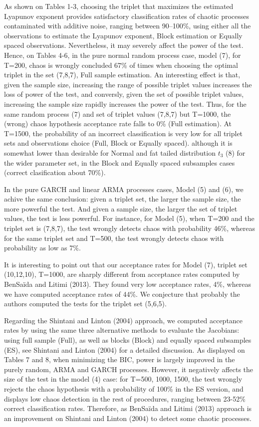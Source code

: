 \documentclass[12pt]{article}
\begin{document}
As shown on Tables 1-3, choosing the triplet that maximizes the estimated Lyapunov exponent provides satisfactory classification rates of chaotic processes contaminated with additive noise, ranging between 90--100\%, using either all the observations to estimate the Lyapunov exponent, Block estimation or Equally spaced observations. Nevertheless, it
may severely affect the power of the test. Hence, on Tables 4-6, in the pure normal random process case, model (7),
for T=200, chaos is wrongly concluded 67\% of times when choosing the 
optimal triplet in the set (7,8,7), Full sample estimation. An interesting effect is that, given the sample size, increasing the range
of possible triplet values increases the loss of power of the test, and conversly, given the set of 
possible triplet values, increasing the sample size rapidly increases the power of the test. Thus, for the same random process (7)
and set of triplet values (7,8,7) but T=1000, the (wrong) chaos hypothesis acceptance rate falls to 0\% (Full estimation). 
At T=1500, the probability of an incorrect classification is very low for all triplet sets and observations choice (Full, Block or Equally spaced). 
although it is somewhat lower than desirable for Normal and fat tailed distribution $t_3$ (8) for the wider parameter set, in the Block and Equally spaced subsamples cases (correct clasification about 70\%).

In the pure GARCH and linear ARMA processes cases, Model (5) and (6), we achive the same conclusion: given a
triplet set, the larger the sample size, the more powerful the test. And given a sample size, the larger the set of triplet values, the test is less powerful. For instance, for Model (5), when T=200 and the triplet set
is (7,8,7), the test wrongly detects chaos with probability 46\%, whereas
for the same triplet set and T=500, the test wrongly detects chaos with probability as low as 7\%.

It is interesting to point out that our acceptance rates for Model 
(7), triplet set (10,12,10), T=1000, are
sharply different from acceptance rates computed by BenSa\"{i}da and Litimi (2013). They found very low acceptance rates, 4\%, whereas we have computed acceptance rates of 44\%.
We conjecture that probably the authors computed the tests for the triplet set (5,6,5).

Regarding the Shintani and Linton (2004) approach, we computed acceptance rates by using the same three alternative methods to evaluate the Jacobians: using full sample (Full), as well as blocks (Block)  and equally spaced subsamples (ES), see Shintani and Linton (2004) for a detailed discussion. As displayed on Tables 7 and 8, when minimizing the BIC, power is largely improved in the purely random, ARMA and GARCH processes.  However, it negatively affects the size of the test in the model (4) case: for T=500, 1000, 1500, the test wrongly rejects the chaos hypothesis with a probability of 100\% in the ES version, and displays low chaos detection in the rest of procedures, ranging between 23-52\% correct classification rates. Therefore, as BenSa\"{i}da and Litimi (2013) approach is an improvement on Shintani and Linton (2004) to detect some chaotic processes. 
\end{document}
